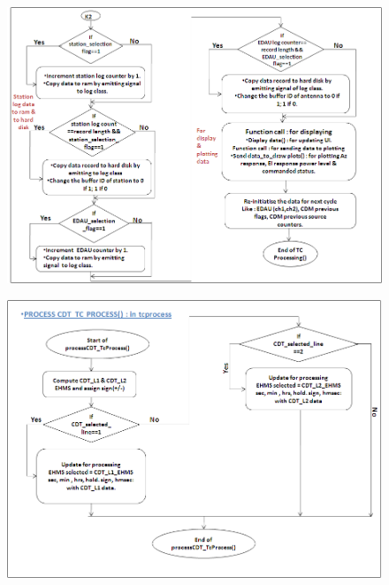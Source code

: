 \begin{figure}[H]
	\centering
	\includegraphics[width=\linewidth]{./FlowCharts/PngFlowCharts/TCP3.png}
\end{figure}

\begin{figure}[H]
	\centering
	\includegraphics[width=\linewidth]{./FlowCharts/PngFlowCharts/TCP4.png}
\end{figure}

